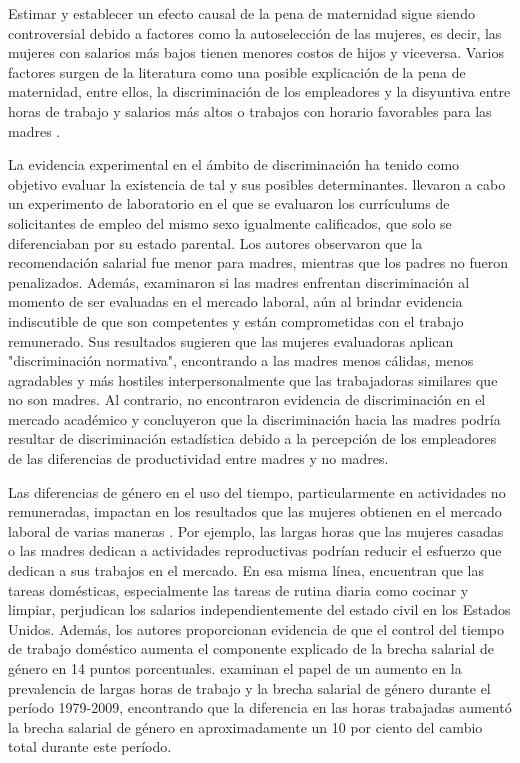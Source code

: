 Estimar y establecer un efecto causal de la pena de maternidad sigue siendo controversial debido a factores como la autoselección de las mujeres, es decir, las mujeres con salarios más bajos tienen menores costos de hijos y viceversa. Varios factores surgen de la literatura como una posible explicación de la pena de maternidad, entre ellos, la discriminación de los empleadores y la disyuntiva entre horas de trabajo y salarios más altos o trabajos con horario favorables para las madres \citep{Budig2001}.

La evidencia experimental en el ámbito de discriminación ha tenido como objetivo evaluar la existencia de tal y sus posibles determinantes. \citet{Correll2007} llevaron a cabo un experimento de laboratorio en el que se evaluaron los currículums de solicitantes de empleo del mismo sexo igualmente calificados, que solo se diferenciaban por su estado parental. Los autores observaron que la recomendación salarial fue menor para madres, mientras que los padres no fueron penalizados. Además, \citet{Benard2010} examinaron si las madres enfrentan discriminación al momento de ser evaluadas en el mercado laboral, aún al brindar evidencia indiscutible de que son competentes y están comprometidas con el trabajo remunerado. Sus resultados sugieren que las mujeres evaluadoras aplican "discriminación normativa", encontrando a las madres menos cálidas, menos agradables y más hostiles interpersonalmente que las trabajadoras similares que no son madres. Al contrario, \citet{Williams2015} no encontraron evidencia de discriminación en el mercado académico y concluyeron que la discriminación hacia las madres podría resultar de discriminación estadística debido a la percepción de los empleadores de las diferencias de productividad entre madres y no madres.

Las diferencias de género en el uso del tiempo, particularmente en actividades no remuneradas, impactan en los resultados que las mujeres obtienen en el mercado laboral de varias maneras \citep{Becker1985,Blau2017}. Por ejemplo, las largas horas que las mujeres casadas o las madres dedican a actividades reproductivas podrían reducir el esfuerzo que dedican a sus trabajos en el mercado. En esa misma línea, \citet{Hersch2002} encuentran que las tareas domésticas, especialmente las tareas de rutina diaria como cocinar y limpiar, perjudican los salarios independientemente del estado civil en los Estados Unidos. Además, los autores proporcionan evidencia de que el control del tiempo de trabajo doméstico aumenta el componente explicado de la brecha salarial de género en 14 puntos porcentuales. \citet{Cha2014} examinan el papel de un aumento en la prevalencia de largas horas de trabajo y la brecha salarial de género durante el período 1979-2009, encontrando que la diferencia en las horas trabajadas aumentó la brecha salarial de género en aproximadamente un 10 por ciento del cambio total durante este período.

